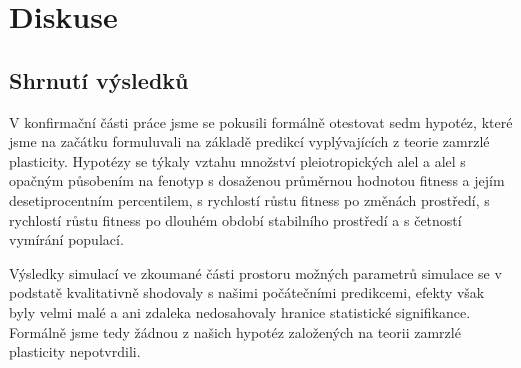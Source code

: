 \chapter{Diskuse}

%
%
%
%
%

\section{Shrnutí výsledků}

V konfirmační části práce jsme se pokusili formálně otestovat sedm hypotéz, které jsme na začátku formuluvali
na základě predikcí vyplývajících z teorie zamrzlé plasticity.
Hypotézy se týkaly vztahu množství pleiotropických alel a alel s opačným působením na fenotyp s dosaženou průměrnou
hodnotou fitness a jejím desetiprocentním percentilem, s rychlostí růstu fitness po změnách prostředí, s rychlostí
růstu fitness po dlouhém období stabilního prostředí a s četností vymírání populací.

Výsledky simulací ve zkoumané části prostoru možných parametrů simulace se v podstatě kvalitativně shodovaly s
našimi počátečními predikcemi, efekty však byly velmi malé a ani zdaleka nedosahovaly hranice statistické signifikance.
Formálně jsme tedy žádnou z našich hypotéz založených na teorii zamrzlé plasticity nepotvrdili.

